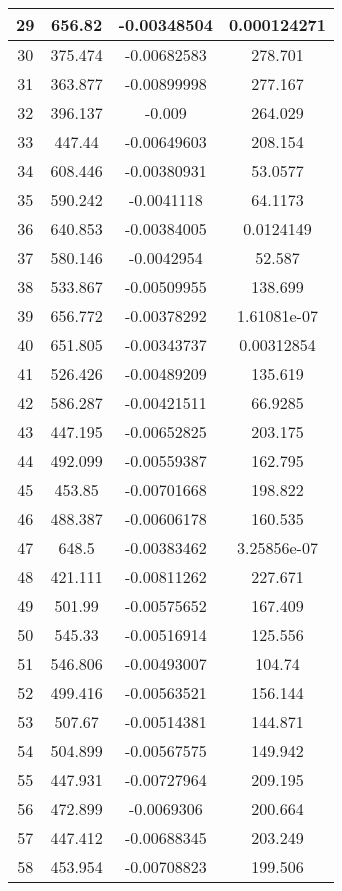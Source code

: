 \begin{table}[h]
{\begin{tabular}{|c|c|c|c|}
29	&	656.82	&	-0.00348504	&	0.000124271	\\	\hline
30	&	375.474	&	-0.00682583	&	278.701	\\	\hline
31	&	363.877	&	-0.00899998	&	277.167	\\	\hline
32	&	396.137	&	-0.009	&	264.029	\\	\hline
33	&	447.44	&	-0.00649603	&	208.154	\\	\hline
34	&	608.446	&	-0.00380931	&	53.0577	\\	\hline
35	&	590.242	&	-0.0041118	&	64.1173	\\	\hline
36	&	640.853	&	-0.00384005	&	0.0124149	\\	\hline
37	&	580.146	&	-0.0042954	&	52.587	\\	\hline
38	&	533.867	&	-0.00509955	&	138.699	\\	\hline
39	&	656.772	&	-0.00378292	&	1.61081e-07	\\	\hline
40	&	651.805	&	-0.00343737	&	0.00312854	\\	\hline
41	&	526.426	&	-0.00489209	&	135.619	\\	\hline
42	&	586.287	&	-0.00421511	&	66.9285	\\	\hline
43	&	447.195	&	-0.00652825	&	203.175	\\	\hline
44	&	492.099	&	-0.00559387	&	162.795	\\	\hline
45	&	453.85	&	-0.00701668	&	198.822	\\	\hline
46	&	488.387	&	-0.00606178	&	160.535	\\	\hline
47	&	648.5	&	-0.00383462	&	3.25856e-07	\\	\hline
48	&	421.111	&	-0.00811262	&	227.671	\\	\hline
49	&	501.99	&	-0.00575652	&	167.409	\\	\hline
50	&	545.33	&	-0.00516914	&	125.556	\\	\hline
51	&	546.806	&	-0.00493007	&	104.74	\\	\hline
52	&	499.416	&	-0.00563521	&	156.144	\\	\hline
53	&	507.67	&	-0.00514381	&	144.871	\\	\hline
54	&	504.899	&	-0.00567575	&	149.942	\\	\hline
55	&	447.931	&	-0.00727964	&	209.195	\\	\hline
56	&	472.899	&	-0.0069306	&	200.664	\\	\hline
57	&	447.412	&	-0.00688345	&	203.249	\\	\hline
58	&	453.954	&	-0.00708823	&	199.506	\\	\hline

\end{tabular}}
\end{table}
